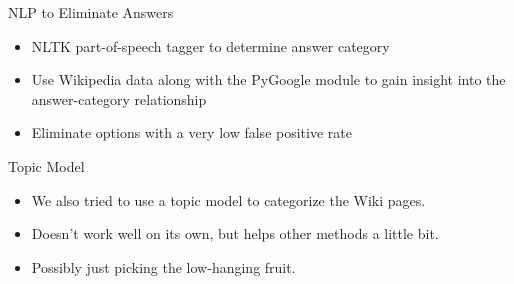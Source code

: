 \documentclass{beamer}
\begin{document}

\begin{frame}{NLP to Eliminate Answers}
   \begin{itemize}
      \item NLTK part-of-speech tagger to determine answer category
      \item Use Wikipedia data along with the PyGoogle module to gain insight into the answer-category relationship
      \item Eliminate options with a very low false positive rate
   \end{itemize}
\end{frame}



\begin{frame}{Topic Model}
   \begin{itemize}
      \item We also tried to use a topic model to categorize the Wiki pages.
      \item Doesn't work well on its own, but helps other methods a little bit.
      \item Possibly just picking the low-hanging fruit.
   \end{itemize}
\end{frame}

\end{document}
